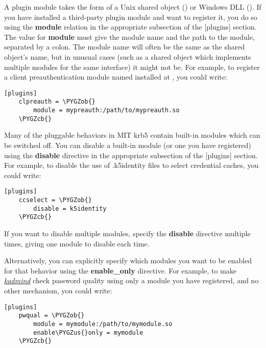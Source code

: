 \documentclass[letterpaper,10pt,english]{sphinxmanual}
\def\PYGZus{\char`\_}
\def\PYGZob{\char`\{}
\def\PYGZcb{\char`\}}
\begin{document}
A plugin module takes the form of a Unix shared object
() or Windows DLL ().  If you have
installed a third-party plugin module and want to register it, you do
so using the \textbf{module} relation in the appropriate subsection of the
{[}plugins{]} section.  The value for \textbf{module} must give the module name
and the path to the module, separated by a colon.  The module name
will often be the same as the shared object's name, but in unusual
cases (such as a shared object which implements multiple modules for
the same interface) it might not be.  For example, to register a
client preauthentication module named  installed at
, you could write:

\begin{Verbatim}[commandchars=\\\{\}]
[plugins]
    clpreauth = \PYGZob{}
        module = mypreauth:/path/to/mypreauth.so
    \PYGZcb{}
\end{Verbatim}

Many of the pluggable behaviors in MIT krb5 contain built-in modules
which can be switched off.  You can disable a built-in module (or one
you have registered) using the \textbf{disable} directive in the
appropriate subsection of the {[}plugins{]} section.  For example, to
disable the use of .k5identity files to select credential caches, you
could write:

\begin{Verbatim}[commandchars=\\\{\}]
[plugins]
    ccselect = \PYGZob{}
        disable = k5identity
    \PYGZcb{}
\end{Verbatim}

If you want to disable multiple modules, specify the \textbf{disable}
directive multiple times, giving one module to disable each time.

Alternatively, you can explicitly specify which modules you want to be
enabled for that behavior using the \textbf{enable\_only} directive.  For
example, to make {\hyperref[admin/admin_commands/kadmind:kadmind-8]{\emph{kadmind}}} check password quality using only a
module you have registered, and no other mechanism, you could write:

\begin{Verbatim}[commandchars=\\\{\}]
[plugins]
    pwqual = \PYGZob{}
        module = mymodule:/path/to/mymodule.so
        enable\PYGZus{}only = mymodule
    \PYGZcb{}
\end{Verbatim}
\end{document}
